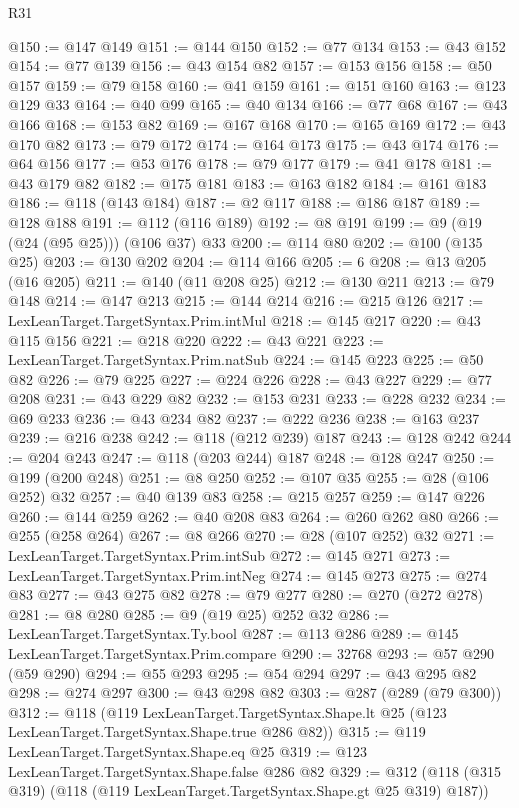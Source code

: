 \begin{lexlean}{R31}
\begin{coremodule}
@150 := @147 @149
@151 := @144 @150
@152 := @77 @134
@153 := @43 @152
@154 := @77 @139
@156 := @43 @154 @82
@157 := @153 @156
@158 := @50 @157
@159 := @79 @158
@160 := @41 @159
@161 := @151 @160
@163 := @123 @129 @33
@164 := @40 @99
@165 := @40 @134
@166 := @77 @68
@167 := @43 @166
@168 := @153 @82
@169 := @167 @168
@170 := @165 @169
@172 := @43 @170 @82
@173 := @79 @172
@174 := @164 @173
@175 := @43 @174
@176 := @64 @156
@177 := @53 @176
@178 := @79 @177
@179 := @41 @178
@181 := @43 @179 @82
@182 := @175 @181
@183 := @163 @182
@184 := @161 @183
@186 := @118 (@143 @184)
@187 := @2 @117
@188 := @186 @187
@189 := @128 @188
@191 := @112 (@116 @189)
@192 := @8 @191
@199 := @9 (@19 (@24 (@95 @25))) (@106 @37) @33
@200 := @114 @80
@202 := @100 (@135 @25)
@203 := @130 @202
@204 := @114 @166
@205 := 6
@208 := @13 @205 (@16 @205)
@211 := @140 (@11 @208 @25)
@212 := @130 @211
@213 := @79 @148
@214 := @147 @213
@215 := @144 @214
@216 := @215 @126
@217 := LexLeanTarget.TargetSyntax.Prim.intMul
@218 := @145 @217
@220 := @43 @115 @156
@221 := @218 @220
@222 := @43 @221
@223 := LexLeanTarget.TargetSyntax.Prim.natSub
@224 := @145 @223
@225 := @50 @82
@226 := @79 @225
@227 := @224 @226
@228 := @43 @227
@229 := @77 @208
@231 := @43 @229 @82
@232 := @153 @231
@233 := @228 @232
@234 := @69 @233
@236 := @43 @234 @82
@237 := @222 @236
@238 := @163 @237
@239 := @216 @238
@242 := @118 (@212 @239) @187
@243 := @128 @242
@244 := @204 @243
@247 := @118 (@203 @244) @187
@248 := @128 @247
@250 := @199 (@200 @248)
@251 := @8 @250
@252 := @107 @35
@255 := @28 (@106 @252) @32
@257 := @40 @139 @83
@258 := @215 @257
@259 := @147 @226
@260 := @144 @259
@262 := @40 @208 @83
@264 := @260 @262 @80
@266 := @255 (@258 @264)
@267 := @8 @266
@270 := @28 (@107 @252) @32
@271 := LexLeanTarget.TargetSyntax.Prim.intSub
@272 := @145 @271
@273 := LexLeanTarget.TargetSyntax.Prim.intNeg
@274 := @145 @273
@275 := @274 @83
@277 := @43 @275 @82
@278 := @79 @277
@280 := @270 (@272 @278)
@281 := @8 @280
@285 := @9 (@19 @25) @252 @32
@286 := LexLeanTarget.TargetSyntax.Ty.bool
@287 := @113 @286
@289 := @145 LexLeanTarget.TargetSyntax.Prim.compare
@290 := 32768
@293 := @57 @290 (@59 @290)
@294 := @55 @293
@295 := @54 @294
@297 := @43 @295 @82
@298 := @274 @297
@300 := @43 @298 @82
@303 := @287 (@289 (@79 @300))
@312 := @118
    (@119
      LexLeanTarget.TargetSyntax.Shape.lt
      @25
      (@123 LexLeanTarget.TargetSyntax.Shape.true @286 @82))
@315 := @119 LexLeanTarget.TargetSyntax.Shape.eq @25
@319 := @123 LexLeanTarget.TargetSyntax.Shape.false @286 @82
@329 := @312 (@118 (@315 @319) (@118 (@119 LexLeanTarget.TargetSyntax.Shape.gt @25 @319) @187))

\end{coremodule}
\end{lexlean}
